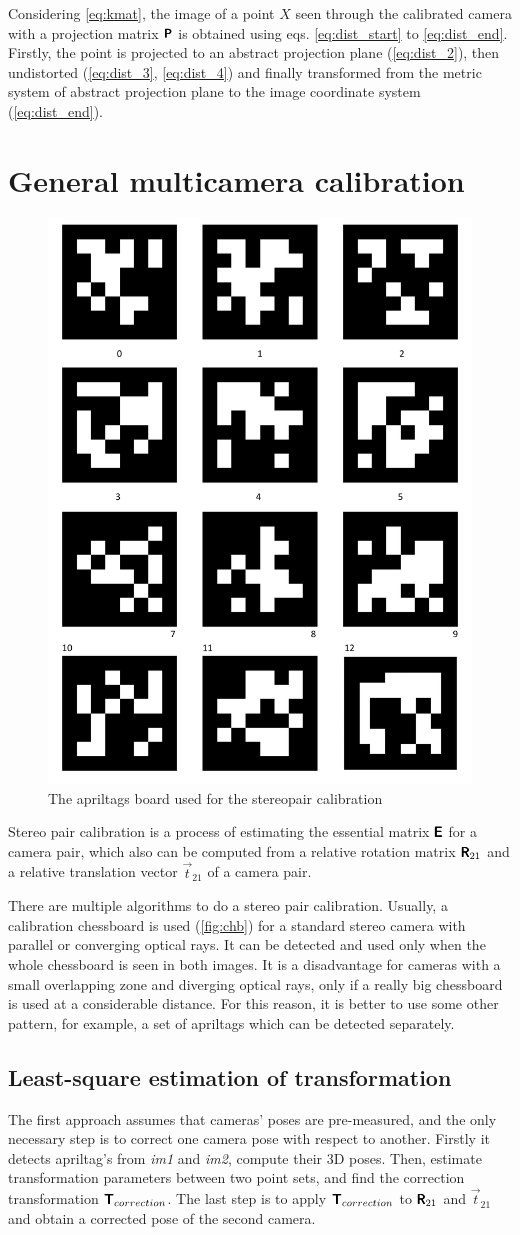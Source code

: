 Considering \eqref{eq:kmat}, the image of a point $X$ seen through the calibrated camera with a projection matrix $\pmb{\mathsf{P}}$ is obtained using eqs. \eqref{eq:dist_start} to \eqref{eq:dist_end}. 
Firstly, the point is projected to an abstract projection plane (\eqref{eq:dist_2}), then undistorted (\eqref{eq:dist_3}, \eqref{eq:dist_4}) and finally transformed from the metric system of abstract projection plane to the image coordinate system (\eqref{eq:dist_end}).

\section{General multicamera calibration}
\label{sec:stereocalib}

\begin{figure}[h]
    \centering
    \includegraphics[width=.2\textwidth]{graphics/aptags.png}
    \caption{The apriltags board used for the stereopair calibration}
    \label{fig:aptags}
\end{figure}

Stereo pair calibration is a process of estimating the essential matrix $\pmb{\mathsf{E}}$ for a camera pair, which also can be computed from a relative rotation matrix $\pmb{\mathsf{R}}_{21}$ and a relative translation vector $\vec{t}_{21}$ of a camera pair. 

There are multiple algorithms to do a stereo pair calibration.
Usually, a calibration chessboard is used (\autoref{fig:chb}) for a standard stereo camera with parallel or converging optical rays.
It can be detected and used only when the whole chessboard is seen in both images.
It is a disadvantage for cameras with a small overlapping zone and diverging optical rays, only if a really big chessboard is used at a considerable distance.
For this reason, it is better to use some other pattern, for example, a set of apriltags \cite{Malyuta2019} which can be detected separately. 

\subsection{Least-square estimation of transformation}
\label{sec:lsq_umeyama}
The first approach assumes that cameras' poses are pre-measured, and the only necessary step is to correct one camera pose with respect to another.
Firstly it detects apriltag's from \textit{im1} and \textit{im2}, compute their 3D poses.
Then, estimate transformation parameters between two point sets, and find the correction transformation $\pmb{\mathsf{T}}_{correction}$.
The last step is to apply $\pmb{\mathsf{T}}_{correction}$ to $\pmb{\mathsf{R}}_{21}$ and $\vec{t}_{21}$ and obtain a corrected pose of the second camera.

